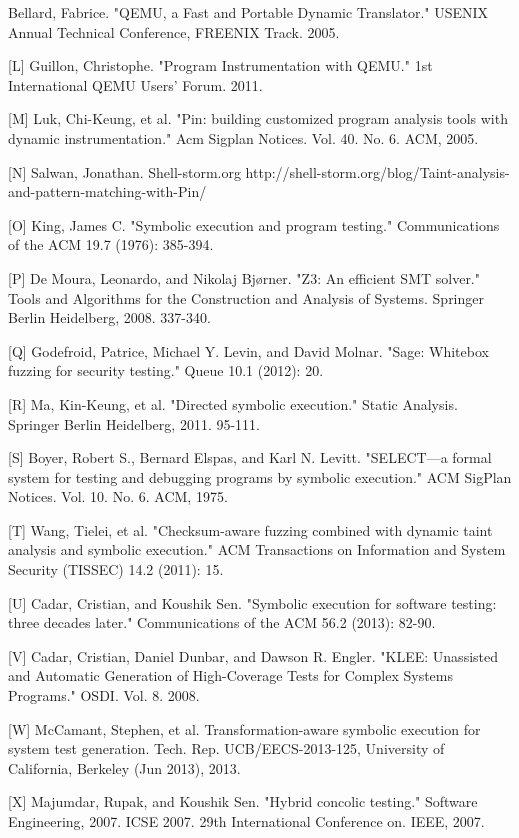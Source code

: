 \documentclass[11pt,expanded,copyright]{fsuthesis}
\begin{document}
\begin{references}
	[K] Bellard, Fabrice. "QEMU, a Fast and Portable Dynamic Translator." USENIX Annual Technical Conference, FREENIX Track. 2005.

	[L] Guillon, Christophe. "Program Instrumentation with QEMU." 1st International QEMU Users’ Forum. 2011.

	[M] Luk, Chi-Keung, et al. "Pin: building customized program analysis tools with dynamic instrumentation." Acm Sigplan Notices. Vol. 40. No. 6. ACM, 2005.

	[N] Salwan, Jonathan. Shell-storm.org http://shell-storm.org/blog/Taint-analysis-and-pattern-matching-with-Pin/

	[O] King, James C. "Symbolic execution and program testing." Communications of the ACM 19.7 (1976): 385-394.

	[P] De Moura, Leonardo, and Nikolaj Bjørner. "Z3: An efficient SMT solver." Tools and Algorithms for the Construction and Analysis of Systems. Springer Berlin Heidelberg, 2008. 337-340.

	[Q] Godefroid, Patrice, Michael Y. Levin, and David Molnar. "Sage: Whitebox fuzzing for security testing." Queue 10.1 (2012): 20.

	[R] Ma, Kin-Keung, et al. "Directed symbolic execution." Static Analysis. Springer Berlin Heidelberg, 2011. 95-111.

	[S] Boyer, Robert S., Bernard Elspas, and Karl N. Levitt. "SELECT—a formal system for testing and debugging programs by symbolic execution." ACM SigPlan Notices. Vol. 10. No. 6. ACM, 1975.

	[T] Wang, Tielei, et al. "Checksum-aware fuzzing combined with dynamic taint analysis and symbolic execution." ACM Transactions on Information and System Security (TISSEC) 14.2 (2011): 15.

	[U] Cadar, Cristian, and Koushik Sen. "Symbolic execution for software testing: three decades later." Communications of the ACM 56.2 (2013): 82-90.

	[V] Cadar, Cristian, Daniel Dunbar, and Dawson R. Engler. "KLEE: Unassisted and Automatic Generation of High-Coverage Tests for Complex Systems Programs." OSDI. Vol. 8. 2008.

	[W] McCamant, Stephen, et al. Transformation-aware symbolic execution for system test generation. Tech. Rep. UCB/EECS-2013-125, University of California, Berkeley (Jun 2013), 2013.

	[X] Majumdar, Rupak, and Koushik Sen. "Hybrid concolic testing." Software Engineering, 2007. ICSE 2007. 29th International Conference on. IEEE, 2007.


\end{references}
\end{document}
